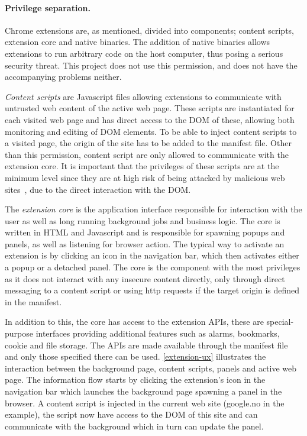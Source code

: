 \paragraph{Privilege separation.} Chrome extensions are, as mentioned, divided into components; content scripts, extension core and native binaries. The addition of native binaries allows extensions to run arbitrary code on the host computer, thus posing a serious security threat. This project does not use this permission, and does not have the accompanying problems neither. 
\par \emph{Content scripts} are Javascript files allowing extensions to communicate with untrusted web content of the active web page. These scripts are instantiated for each visited web page and has direct access to the DOM of these, allowing both monitoring and editing of DOM elements. To be able to inject content scripts to a visited page, the origin of the site has to be added to the manifest file. Other than this permission, content script are only allowed to communicate with the extension core. It is important that the privileges of these scripts are at the minimum level since they are at high risk of being attacked by malicious web sites~\cite{chrome-extension-dangers}, due to the direct interaction with the DOM. 
\par The \emph{extension core} is the application interface responsible for interaction with the user as well as long running background jobs and business logic. The core is written in HTML and Javascript and is responsible for spawning popups and panels, as well as listening for browser action. The typical way to activate an extension is by clicking an icon in the navigation bar, which then activates either a popup or a detached panel. The core is the component with the most privileges as it does not interact with any insecure content directly, only through direct messaging to a content script or using http requests if the target origin is defined in the manifest. 
\par In addition to this, the core has access to the extension APIs, these are special-purpose interfaces providing additional features such as alarms, bookmarks, cookie and file storage. The APIs are made available through the manifest file and only those specified there can be used. \autoref{extension-ux} illustrates the interaction between the background page, content scripts, panels and active web page. The information flow starts by clicking the extension's icon in the navigation bar which launches the background page spawning a panel in the browser. A content script is injected in the current web site (google.no in the example), the script now have access to the DOM of this site and can communicate with the background which in turn can update the panel. 


